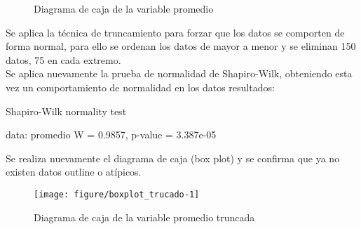 \begin{itemize}
\begin{figure}[ht]
		\caption{Diagrama de caja de la variable promedio}
		\label{fig:diagrama_boxplot_promedio}
	\end{figure}
	
	\bigskip

	Se aplica la técnica de truncamiento para forzar que los datos se comporten de forma normal, para ello se ordenan los datos de mayor a menor y se eliminan 150 datos, 75 en cada extremo. \\
	
	Se aplica nuevamente la prueba de normalidad de Shapiro-Wilk, obteniendo esta vez un comportamiento de normalidad en los datos resultados:\\
	
	\begin{center}
\begin{kframe}
\begin{alltt}
         
\end{alltt}
\end{kframe}
	Shapiro-Wilk normality test

data:  promedio
W = 0.9857, p-value = 3.387e-05


	\end{center}
	\bigskip	
	Se realiza nuevamente el diagrama de caja (box plot) y se confirma que ya no existen datos outline o atípicos.
	
	\begin{figure}[ht]
		\centering
\begin{kframe}
\begin{alltt}
        \hlopt{$}  \hlstd{=}\hlstd{,} \hlstd{=}\hlstd{,} \hlstd{=}\hlstd{,} \hlstd{=}\hlstd{)}
\end{alltt}
\end{kframe}
\texttt{[image: figure/boxplot\_trucado-1]} 

		\caption{Diagrama de caja de la variable promedio truncada}
		\label{fig:diagrama_boxplot_promedio_truncada}
	\end{figure}
		
	\begin{figure}[ht]
		\centering
\begin{kframe}
\begin{alltt}


\end{alltt}
\end{kframe}
\end{figure}
\end{itemize}
